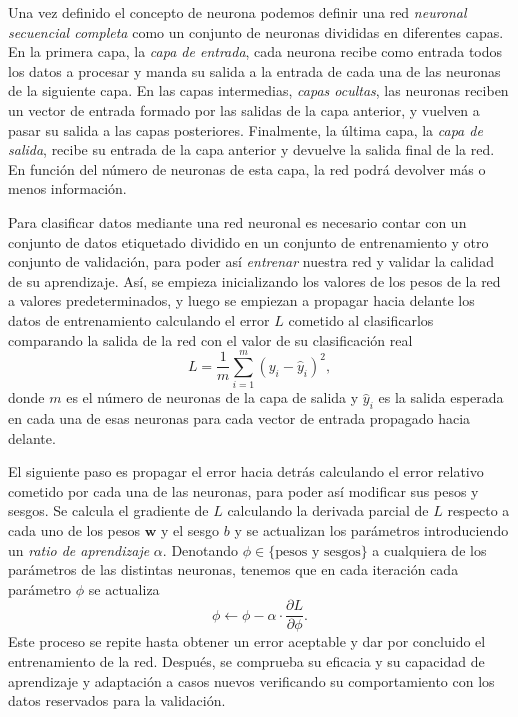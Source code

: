 Una vez definido el concepto de neurona podemos definir una red \textit{neuronal secuencial completa} como un conjunto de neuronas divididas en diferentes capas. En la primera capa, la \textit{capa de entrada}, cada neurona recibe como entrada todos los datos a procesar y manda su salida a la entrada de cada una de las neuronas de la siguiente capa. En las capas intermedias, \textit{capas ocultas}, las neuronas reciben un vector de entrada formado por las salidas de la capa anterior, y vuelven a pasar su salida a las capas posteriores. Finalmente, la última capa, la \textit{capa de salida}, recibe su entrada de la capa anterior y devuelve la salida final de la red. En función del número de neuronas de esta capa, la red podrá devolver más o menos información.

Para clasificar datos mediante una red neuronal es necesario contar con un conjunto de datos etiquetado dividido en un conjunto de entrenamiento y otro conjunto de validación, para poder así \textit{entrenar} nuestra red y validar la calidad de su aprendizaje. Así, se empieza inicializando los valores de los pesos de la red a valores predeterminados, y luego se empiezan a propagar hacia delante los datos de entrenamiento calculando el error $ L $ cometido al clasificarlos comparando la salida de la red con el valor de su clasificación real
\begin{equation}
  L = \frac{1}{m} \sum_{i=1}^{m}(y_i - \hat{y}_i)^2,
\end{equation}
donde $ m $ es el número de neuronas de la capa de salida y $ \hat{y}_i $ es la salida esperada en cada una de esas neuronas para cada vector de entrada propagado hacia delante.

El siguiente paso es propagar el error hacia detrás calculando el error relativo cometido por cada una de las neuronas, para poder así modificar sus pesos y sesgos. Se calcula el gradiente de $ L $ calculando la derivada parcial de $ L $ respecto a cada uno de los pesos $ \mathbf{w} $ y el sesgo $ b $ y se actualizan los parámetros introduciendo un \textit{ratio de aprendizaje} $ \alpha $. Denotando $ \phi \in \{\text{pesos y sesgos}\} $ a cualquiera de los parámetros de las distintas neuronas, tenemos que en cada iteración cada parámetro $ \phi $ se actualiza
\begin{equation}
  \phi \leftarrow \phi - \alpha \cdot \frac{\partial L}{\partial \phi}.
\end{equation}
Este proceso se repite hasta obtener un error aceptable y dar por concluido el entrenamiento de la red. Después, se comprueba su eficacia y su capacidad de aprendizaje y adaptación a casos nuevos verificando su comportamiento con los datos reservados para la validación.


